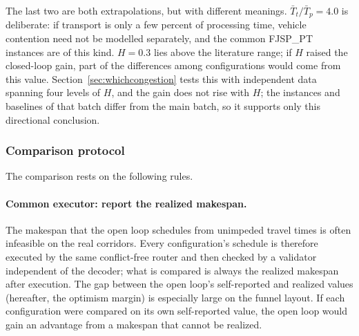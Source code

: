 \documentclass[manuscript,screen,review]{acmart}
\begin{document}
The last two are both extrapolations, but with different meanings.
$\bar{T}_t/\bar{T}_p=4.0$ is deliberate: if transport is only a few percent of processing time, vehicle contention need not be modelled separately, and the common FJSP\_PT instances are of this kind.
$H=0.3$ lies above the literature range; if $H$ raised the closed-loop gain, part of the differences among configurations would come from this value.
Section~\ref{sec:whichcongestion} tests this with independent data spanning four levels of $H$, and the gain does not rise with $H$; the instances and baselines of that batch differ from the main batch, so it supports only this directional conclusion.

\begin{table}[t]
\caption{Controlled instances. All instances share $12$ jobs, $36$ real operations, $8$ robotic arms, $H=0.3$, and
$\bar{T}_t/\bar{T}_p\approx4.0$; the three families vary only the layout, the vehicle-to-arm ratio, and flexibility, respectively. Contention intensity is the share of yielding wait in total travel time on the initial
random population; it is determined by the instance structure and is not an input parameter.}
\label{tab:instances}
\small

\end{table}

\subsubsection{Comparison protocol}
\label{sec:protocol}

The comparison rests on the following rules.

\paragraph{Common executor: report the realized makespan.}
The makespan that the open loop schedules from unimpeded travel times is often infeasible on the real corridors.
Every configuration's schedule is therefore executed by the same conflict-free router and then checked by a validator independent of the decoder; what is compared is always the realized makespan after execution.
The gap between the open loop's self-reported and realized values (hereafter, the optimism margin) is especially large on the funnel layout.
If each configuration were compared on its own self-reported value, the open loop would gain an advantage from a makespan that cannot be realized.
\end{document}
